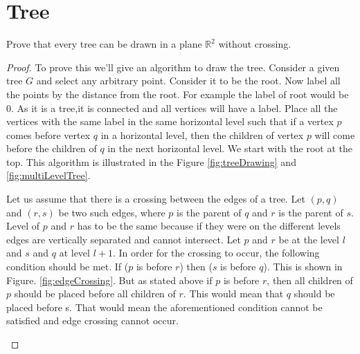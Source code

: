 \documentclass{article}
\def\R{\mathbb{R}}
\begin{document}
\section{Tree}
\begin{theorem}
  Prove that every tree can be drawn in a plane $\R^2$  without crossing.
  \end{theorem}
      \begin{proof}
 To prove this we'll give an algorithm to draw the tree. Consider a given tree $G$ and select any arbitrary point. Consider it to be the root. Now label all the points by the distance from the root. For example the label of root would be 0. As it is a tree,it is connected and all vertices will have a label. Place all the vertices with the same label in the same horizontal level such that if a vertex $p$ comes before vertex $q$ in a horizontal level, then the children of vertex $p$ will come before the children of $q$ in the next horizontal level. We start with the root at the top. This algorithm is illustrated in the Figure \ref{fig:treeDrawing} and \ref{fig:multiLevelTree}.

Let us assume that there is a crossing between the edges of a tree. Let $(p,q)$ and $(r,s)$ be two such edges, where $p$ is the parent of $q$ and $r$ is the parent of $s$. Level of $p$ and $r$ has to be the same because if they were on the different levels edges are vertically separated and cannot intersect. Let $p$ and $r$ be at the level $l$ and $s$ and $q$ at level $l+1$. In order for the crossing to occur, the following condition should be met. If ($p$ is before $r$) then ($s$ is before $q$). This is shown in Figure. \ref{fig:edgeCrossing}. But as stated above if $p$ is before $r$, then all children of $p$ should be placed before all children of $r$. This would mean that $q$ should be placed before s. That would mean the aforementioned condition cannot be satisfied and edge crossing cannot occur.
          \begin{figure}[H]
\begin{center}

    
    \begin{tikzpicture}[x=0.75pt,y=0.75pt,yscale=-1,xscale=1]
    

\end{tikzpicture}
\end{center}
\end{figure}
\end{proof}
\end{document}
